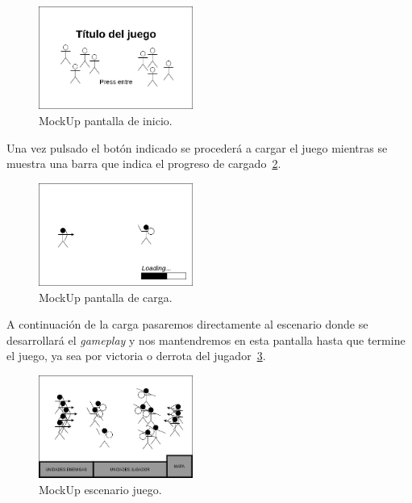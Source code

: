 \begin{figure}[ht]
\centering
\includegraphics[width=0.45\textwidth]{imagenes/gdd/pantallas/Pantalla_ini.png}
\caption{MockUp pantalla de inicio.}
\label{mockup_ini}
\end{figure}

Una vez pulsado el botón indicado se procederá a cargar el juego mientras se muestra
una barra que indica el progreso de cargado~\ref{mockup_carga}.

\begin{figure}[ht]
\centering
\includegraphics[width=0.45\textwidth]{imagenes/gdd/pantallas/Pantalla_carga.png}
\caption{MockUp pantalla de carga.}
\label{mockup_carga}
\end{figure}

A continuación de la carga pasaremos directamente al escenario donde se desarrollará el
\textit{gameplay} y nos mantendremos en esta pantalla hasta que termine el juego, ya sea
por victoria o derrota del jugador~\ref{mockup_juego}.

\begin{figure}[ht]
\centering
\includegraphics[width=0.45\textwidth]{imagenes/gdd/pantallas/Pantalla_gameplay.png}
\caption{MockUp escenario juego.}
\label{mockup_juego}
\end{figure}

